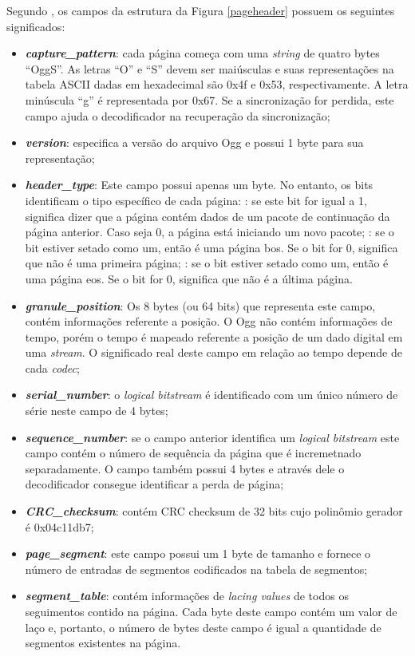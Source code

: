 Segundo \cite{ogg}, os campos da estrutura da Figura \ref{pageheader} possuem os seguintes significados:

\begin{itemize}
	\item{\textbf{\textit{capture\_pattern}}:} cada página começa com uma \textit{string} de quatro bytes ``OggS''. As letras ``O'' e ``S'' devem ser maiúsculas e suas representações na tabela ASCII dadas em hexadecimal são 0x4f e 0x53, respectivamente. A letra minúscula ``g'' é representada por 0x67. Se a sincronização for perdida, este campo ajuda o decodificador na recuperação da sincronização;
	\item{\textbf{\textit{version}}:} especifica a versão do arquivo Ogg e possui 1 byte para sua representação;
	\item{\textbf{\textit{header\_type}}:} Este campo possui apenas um byte. No entanto, os bits identificam o tipo específico de cada página:
	: se este bit for igual a 1, significa dizer que a página contém dados de um pacote de continuação da página anterior. Caso seja 0, a página está iniciando um novo pacote;
	: se o bit estiver setado como um, então é uma página bos. Se o bit for 0, significa que não é uma primeira página;
	: se o bit estiver setado como um, então é uma página eos. Se o bit for 0, significa que não é a última página.
	\item{\textbf{\textit{granule\_position}}:} Os 8 bytes (ou 64 bits) que representa este campo, contém informações referente a posição. O Ogg não contém informações de tempo, porém o tempo é mapeado referente a posição de um dado digital em uma \textit{stream}. O significado real deste campo em relação ao tempo depende de cada \textit{codec};
	\item{\textbf{\textit{serial\_number}}:} o \textit{logical bitstream} é identificado com um único número de série neste campo de 4 bytes;
	\item{\textbf{\textit{sequence\_number}}:} se o campo anterior identifica um \textit{logical bitstream} este campo contém o número de sequência da página que é incremetnado separadamente. O campo também possui 4 bytes e através dele o decodificador consegue identificar a perda de página;
	\item{\textbf{\textit{CRC\_checksum}}:} contém CRC checksum de 32 bits cujo polinômio gerador é 0x04c11db7;
	\item{\textbf{\textit{page\_segment}}:} este campo possui um 1 byte de tamanho e fornece o número de entradas de segmentos codificados na tabela de segmentos;
	\item{\textbf{\textit{segment\_table}}:} contém informações de \textit{lacing values} de todos os seguimentos contido na página. Cada byte deste campo contém um valor de laço e, portanto, o número de bytes deste campo é igual a quantidade de segmentos existentes na página. 
\end{itemize}


